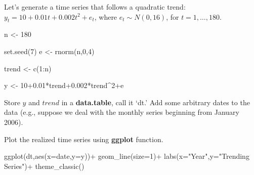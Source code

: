 \documentclass[
  oneside]{book}
\newenvironment{Shaded}{\begin{snugshade}}{\end{snugshade}}
\newcommand{\AttributeTok}[1]{\textcolor[rgb]{0.77,0.63,0.00}{#1}}
\newcommand{\DecValTok}[1]{\textcolor[rgb]{0.00,0.00,0.81}{#1}}
\newcommand{\FloatTok}[1]{\textcolor[rgb]{0.00,0.00,0.81}{#1}}
\newcommand{\FunctionTok}[1]{\textcolor[rgb]{0.00,0.00,0.00}{#1}}
\newcommand{\NormalTok}[1]{#1}
\newcommand{\OtherTok}[1]{\textcolor[rgb]{0.56,0.35,0.01}{#1}}
\newcommand{\SpecialCharTok}[1]{\textcolor[rgb]{0.00,0.00,0.00}{#1}}
\newcommand{\StringTok}[1]{\textcolor[rgb]{0.31,0.60,0.02}{#1}}
\begin{document}
Let's generate a time series that follows a quadratic trend: \(y_{t} = 10+0.01t+0.002t^2+e_{t}\), where \(e_{t} \sim N(0,16)\), for \(t=1,\ldots,180\).

\begin{Shaded}
\begin{Highlighting}[]
\NormalTok{n }\OtherTok{\textless{}{-}} \DecValTok{180}

\FunctionTok{set.seed}\NormalTok{(}\DecValTok{7}\NormalTok{)}
\NormalTok{e }\OtherTok{\textless{}{-}} \FunctionTok{rnorm}\NormalTok{(n,}\DecValTok{0}\NormalTok{,}\DecValTok{4}\NormalTok{)}

\NormalTok{trend }\OtherTok{\textless{}{-}} \FunctionTok{c}\NormalTok{(}\DecValTok{1}\SpecialCharTok{:}\NormalTok{n)}

\NormalTok{y }\OtherTok{\textless{}{-}} \DecValTok{10}\FloatTok{+0.01}\SpecialCharTok{*}\NormalTok{trend}\FloatTok{+0.002}\SpecialCharTok{*}\NormalTok{trend}\SpecialCharTok{\^{}}\DecValTok{2}\SpecialCharTok{+}\NormalTok{e}
\end{Highlighting}
\end{Shaded}

Store \(y\) and \(trend\) in a \textbf{data.table}, call it `dt.' Add some arbitrary dates to the data (e.g., suppose we deal with the monthly series beginning from January 2006).

\begin{Shaded}
\end{Shaded}

Plot the realized time series using \textbf{ggplot} function.

\begin{Shaded}
\begin{Highlighting}[]
\FunctionTok{ggplot}\NormalTok{(dt,}\FunctionTok{aes}\NormalTok{(}\AttributeTok{x=}\NormalTok{date,}\AttributeTok{y=}\NormalTok{y))}\SpecialCharTok{+}
  \FunctionTok{geom\_line}\NormalTok{(}\AttributeTok{size=}\DecValTok{1}\NormalTok{)}\SpecialCharTok{+}
  \FunctionTok{labs}\NormalTok{(}\AttributeTok{x=}\StringTok{"Year"}\NormalTok{,}\AttributeTok{y=}\StringTok{"Trending Series"}\NormalTok{)}\SpecialCharTok{+}
  \FunctionTok{theme\_classic}\NormalTok{()}
\end{Highlighting}
\end{Shaded}
\end{document}
